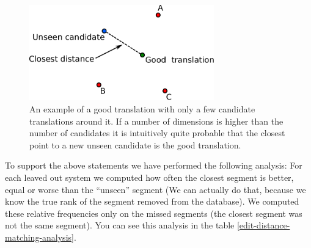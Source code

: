 \begin{figure}
    \begin{center}
        \includegraphics[width=8cm]{img/translation-space.pdf}
    \end{center}

    \caption[An illustration of a space of translations]{An example of a good
    translation with only a few candidate translations around it. If a number
  of dimensions is higher than the number of candidates it is intuitively quite
probable that the closest point to a new unseen candidate is the good
translation.}
    \label{translation-space-illustration}
\end{figure}

To support the above statements we have performed the following analysis: For
each leaved out system we computed how often the closest segment is better, equal or
worse than the ``unseen'' segment (We can actually do that, because we know the true 
rank of the segment removed from the database). We computed these relative frequencies
only on the missed segments (the closest segment was not the same segment). You 
can see this analysis in the table \ref{edit-distance-matching-analysis}.


